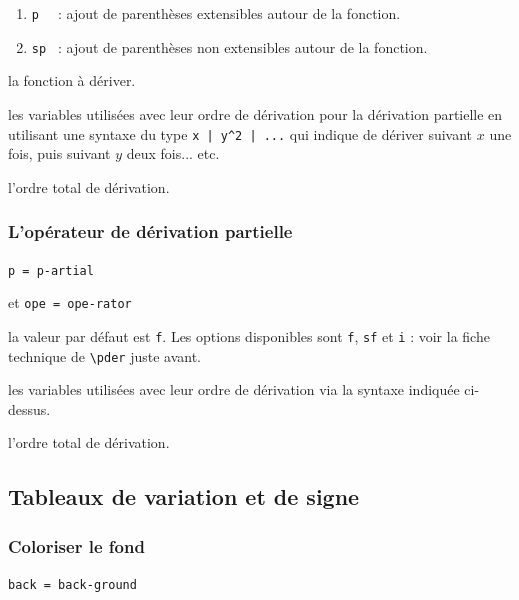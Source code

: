 \documentclass[12pt,a4paper]{book}
\newcommand\env[1]{\texttt{#1}}
\newcommand\macro[1]{\env{\textbackslash{}#1}}
\theoremstyle{definition}
\newcommand\mwhyprefix[2]{%
	\texttt{#1 = #1-#2}%
}
\begin{document}
{{\begin{enumerate}
	\item \verb+p  + : ajout de parenthèses extensibles autour de la fonction.

	\item \verb+sp + : ajout de parenthèses non extensibles autour de la fonction.
\end{enumerate}


 la fonction à dériver.

 les variables utilisées avec leur ordre de dérivation pour la dérivation partielle en utilisant une syntaxe du type \verb+x | y^2 | ...+ qui indique de dériver suivant $x$ une fois, puis suivant $y$ deux fois... etc.

 l'ordre total de dérivation.




\subsubsection{L'opérateur de dérivation partielle} \label{tnsana-ope-partial-der}



 \hfill \mwhyprefix{p}{artial}
                            et \mwhyprefix{ope}{rator}

\IDoption{} la valeur par défaut est \verb+f+. Les options disponibles sont \verb+f+, \verb+sf+ et \verb+i+ : voir la fiche technique de \macro{pder} juste avant.

 les variables utilisées avec leur ordre de dérivation via la syntaxe indiquée ci-dessus.

 l'ordre total de dérivation.











\subsection{Tableaux de variation et de signe}



\subsubsection{Coloriser le fond}

 \hfill \mwhyprefix{back}{ground}


}}
\end{document}
